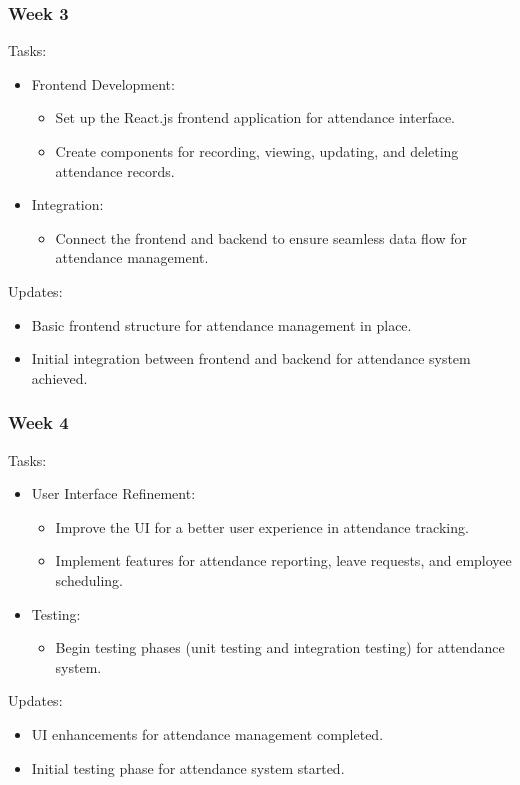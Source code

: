 \documentclass[a4paper, 12pt]{article}
\begin{document}
\subsubsection{Week 3}
Tasks:
\begin{itemize}
    \item Frontend Development:
    \begin{itemize}
        \item Set up the React.js frontend application for attendance interface.
        \item Create components for recording, viewing, updating, and deleting attendance records.
    \end{itemize}
    \item Integration:
    \begin{itemize}
        \item Connect the frontend and backend to ensure seamless data flow for attendance management.
    \end{itemize}
\end{itemize}
Updates:
\begin{itemize}
    \item Basic frontend structure for attendance management in place.
    \item Initial integration between frontend and backend for attendance system achieved.
\end{itemize}

\subsubsection{Week 4}
Tasks:
\begin{itemize}
    \item User Interface Refinement:
    \begin{itemize}
        \item Improve the UI for a better user experience in attendance tracking.
        \item Implement features for attendance reporting, leave requests, and employee scheduling.
    \end{itemize}
    \item Testing:
    \begin{itemize}
        \item Begin testing phases (unit testing and integration testing) for attendance system.
    \end{itemize}
\end{itemize}
Updates:
\begin{itemize}
    \item UI enhancements for attendance management completed.
    \item Initial testing phase for attendance system started.
\end{itemize}
\end{document}
